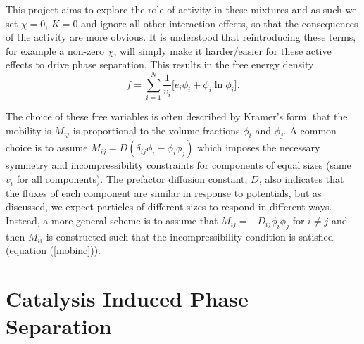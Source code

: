 This project aims to explore the role of activity in these mixtures and as such we set $\chi = 0$, $K = 0$ and ignore all other interaction effects, so that the consequences of the activity are more obvious. It is understood that reintroducing these terms, for example a non-zero $\chi$, will simply make it harder/easier for these active effects to drive phase separation. This results in the free energy density
\begin{equation}
    f = \sum_{i=1}^{N}\frac{1}{v_i}\Bigg[e_i\phi_i + \phi_i\ln\phi_i\Bigg].
    \label{f}
\end{equation}

The choice of these free variables is often described by Kramer's form\cite{KRAMER1984473}, that the mobility is $M_{ij}$ is proportional to the volume fractions $\phi_i$ and $\phi_j$. A common choice is to assume $M_{ij} = D(\delta_{ij}\phi_i - \phi_i\phi_j)$ which imposes the necessary  symmetry and incompressibility constraints for components of equal sizes (same $v_i$ for all components). The prefactor diffusion constant, $D$, also indicates that the fluxes of each component are similar in response to potentials, but as discussed, we expect particles of different sizes to respond in different ways. Instead, a more general scheme is to assume that $M_{ij} = -D_{ij}\phi_i\phi_j$ for $i \neq j$ and then $M_{ii}$ is constructed such that the incompressibility condition is satisfied (equation (\ref{mobinc})).

\section{Catalysis Induced Phase Separation}
